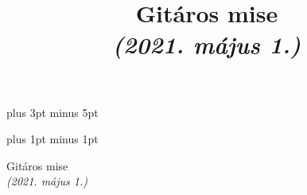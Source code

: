 \documentclass[a5paper,twoside]{article}
\title{Gitáros mise\\\textit{(2021. május 1.)}}
\date{}
\renewcommand{\_}[1]{\underline{#1}} %
\begin{document}


  \versesep=12pt plus 3pt minus 5pt

  \iflyric
    \baselineadj=2pt plus 1pt minus 1pt
  \fi

  \begin{center}
    \vspace*{1.5cm}
    {\huge Gitáros mise} \\
    \vspace*{0.1cm}
    {\Large \textit{(2021. május 1.)}}
    \vspace{2cm}
  \end{center}


  \begin{songs}{}
    
    

    

    

    

    
  \end{songs}
\end{document}
